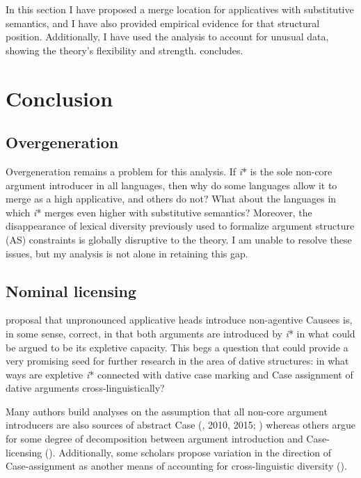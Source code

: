 \documentclass[output=paper,modfonts,nonflat]{langsci/langscibook}
\begin{document}
In this section I have proposed a merge location for applicatives with substitutive semantics, and I have also provided empirical evidence for that structural position. Additionally, I have used the analysis to account for unusual data, showing the theory’s flexibility and strength.  concludes. 

\section{Conclusion}\label{sec:wechsler:4}

\subsection{Overgeneration}\label{sec:wechsler:4.1}

Overgeneration remains a problem for this analysis. If \textit{i}* is the sole non-core argument introducer in all languages, then why do some languages allow it to merge as a high applicative, and others do not? What about the languages in which \textit{i}* merges even higher with substitutive semantics? Moreover, the disappearance of lexical diversity previously used to formalize argument structure (AS) constraints is globally disruptive to the theory. I am unable to resolve these issues, but my analysis is not alone in retaining this gap.

\subsection{Nominal licensing}\label{sec:wechsler:4.2}

 proposal that unpronounced applicative heads introduce non-agentive Causees is, in some sense, correct, in that both arguments are introduced by \textit{i}* in what could be argued to be its expletive capacity. This begs a question that could provide a very promising seed for further research in the area of dative structures: in what ways are expletive \textit{i}* connected with dative case marking and Case assignment of dative arguments cross-linguistically? 



Many authors build analyses on the assumption that all non-core argument introducers are also sources of abstract Case (\citealt{MchomboFirmino1999,Jeong2007,Cuervo2003}, 2010, 2015; \citealt{Sheehan2013,vanderWal2017}) whereas others argue for some degree of decomposition between argument introduction and Case-licensing (\citealt{BakerCollins2006,GeorgalaEtAl2008,Georgala2012,HaddicanHolmberg2012,Halpert2012,Wechsler2014,Wechsler2016}). Additionally, some scholars propose variation in the direction of Case-assignment as another means of accounting for cross-linguistic diversity (\citealt{Sheehan2013,vanderWal2017,Baker2008}). 
\end{document}
